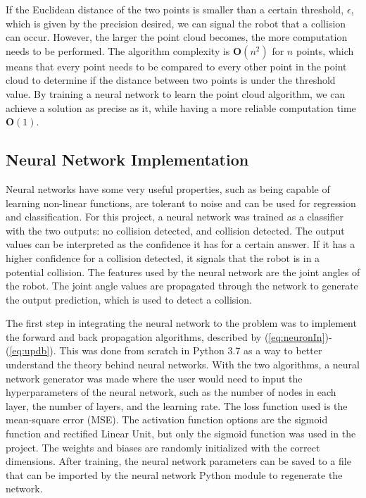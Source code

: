 \documentclass[conference]{IEEEtran}
\begin{document}
If the Euclidean distance of the two points is smaller than a certain threshold, $\epsilon$, which is given by the precision desired, we can signal the robot that a collision can occur. However, the larger the point cloud becomes, the more computation needs to be performed. The algorithm complexity is $\textbf{O}(n^2)$ for $n$ points, which means that every point needs to be compared to every other point in the point cloud to determine if the distance between two points is under the threshold value. By training a neural network to learn the point cloud algorithm, we can achieve a solution as precise as it, while having a more reliable computation time $\textbf{O}(1)$.

\subsection{Neural Network Implementation}
Neural networks have some very useful properties, such as being capable of learning non-linear functions, are tolerant to noise and can be used for regression and classification. For this project, a neural network was trained as a classifier with the two outputs: no collision detected, and collision detected. The output values can be interpreted as the confidence it has for a certain answer. If it has a higher confidence for a collision detected, it signals that the robot is in a potential collision. The features used by the neural network are the joint angles of the robot. The joint angle values are propagated through the network to generate the output prediction, which is used to detect a collision.

The first step in integrating the neural network to the problem was to implement the forward and back propagation algorithms, described by (\ref{eq:neuronIn})-(\ref{eq:updb}). This was done from scratch in Python 3.7 as a way to better understand the theory behind neural networks. With the two algorithms, a neural network generator was made where the user would need to input the hyperparameters of the neural network, such as the number of nodes in each layer, the number of layers, and the learning rate. The loss function used is the mean-square error (MSE). The activation function options are the sigmoid function and rectified Linear Unit, but only the sigmoid function was used in the project. The weights and biases are randomly initialized with the correct dimensions. After training, the neural network parameters can be saved to a file that can be imported by the neural network Python module to regenerate the network. 
\end{document}
